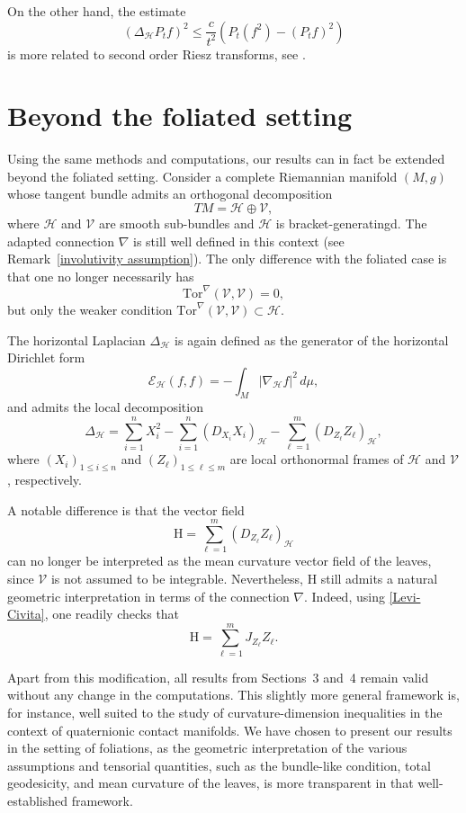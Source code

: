\documentclass[11pt]{article}
\numberwithin{equation}{section}
\newcommand{\Ho}{\mathcal H}
\newcommand{\Tor}{\mathrm{Tor}}
\begin{document}
On the other hand, the estimate 
\[
(\Delta_\Ho P_t f)^2 \le  \frac{c}{t^2}  \left( P_t(f^2)-(P_t f)^2 \right)
\]
is more related to second order Riesz transforms, see \cite{2021arXiv210813058C}.

\section{Beyond the foliated setting}

Using the same methods and computations, our results can in fact be extended beyond the foliated setting. Consider a complete Riemannian manifold $(M,g)$ whose tangent bundle admits an orthogonal decomposition
\[
TM=\mathcal{H}\oplus\mathcal{V},
\]
where $\mathcal{H}$ and $\mathcal{V}$ are smooth sub-bundles and $\Ho$ is bracket-generatingd. The adapted connection $\nabla$ is still well defined in this context (see Remark~\ref{involutivity assumption}). The only difference with the foliated case is that one no longer necessarily has
\[
\Tor^\nabla(\mathcal{V},\mathcal{V})=0,
\]
but only the weaker condition $\Tor^\nabla(\mathcal{V},\mathcal{V})\subset\mathcal{H}$.

The horizontal Laplacian $\Delta_{\mathcal{H}}$ is again defined as the generator of the horizontal Dirichlet form
\[
\mathcal{E}_{\mathcal{H}}(f,f)=-\int_M |\nabla_{\mathcal{H}}f|^2\,d\mu,
\]
and admits the local decomposition
\[
\Delta_{\mathcal{H}}
=
\sum_{i=1}^n X_i^2
-\sum_{i=1}^n (D_{X_i}X_i)_{\mathcal{H}}
-\sum_{\ell=1}^m (D_{Z_\ell}Z_\ell)_{\mathcal{H}},
\]
where $(X_i)_{1\le i\le n}$ and $(Z_\ell)_{1\le \ell\le m}$ are local orthonormal frames of $\mathcal{H}$ and $\mathcal{V}$, respectively.

A notable difference is that the vector field
\[
\mathrm{H}=\sum_{\ell=1}^m (D_{Z_\ell}Z_\ell)_{\mathcal{H}}
\]
can no longer be interpreted as the mean curvature vector field of the leaves, since $\mathcal{V}$ is not assumed to be integrable. Nevertheless, $\mathrm{H}$ still admits a natural geometric interpretation in terms of the connection $\nabla$. Indeed, using \eqref{Levi-Civita}, one readily checks that
\[
\mathrm{H}=\sum_{\ell=1}^m J_{Z_\ell}Z_\ell.
\]

Apart from this modification, all results from Sections~3 and~4 remain valid without any change in the computations. This slightly more general framework is, for instance, well suited to the study of curvature-dimension inequalities in the context of quaternionic contact manifolds. We have chosen to present our results  in the setting of foliations, as the geometric interpretation of the various assumptions and tensorial quantities, such as the bundle-like condition, total geodesicity, and mean curvature of the leaves, is more transparent in that well-established framework.





\end{document}
